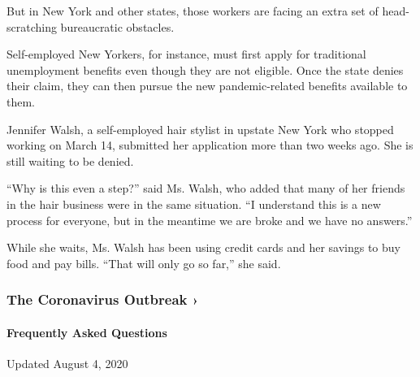 But in New York and other states, those workers are facing an extra set
of head-scratching bureaucratic obstacles.

Self-employed New Yorkers, for instance, must first apply for
traditional unemployment benefits even though they are not eligible.
Once the state denies their claim, they can then pursue the new
pandemic-related benefits available to them.

Jennifer Walsh, a self-employed hair stylist in upstate New York who
stopped working on March 14, submitted her application more than two
weeks ago. She is still waiting to be denied.

``Why is this even a step?'' said Ms. Walsh, who added that many of her
friends in the hair business were in the same situation. ``I understand
this is a new process for everyone, but in the meantime we are broke and
we have no answers.''

While she waits, Ms. Walsh has been using credit cards and her savings
to buy food and pay bills. ``That will only go so far,'' she said.

\href{https://www.nytimes3xbfgragh.onion/news-event/coronavirus?action=click\&pgtype=Article\&state=default\&region=MAIN_CONTENT_3\&context=storylines_faq}{}

\hypertarget{the-coronavirus-outbreak-}{%
\subsubsection{The Coronavirus Outbreak
›}\label{the-coronavirus-outbreak-}}

\hypertarget{frequently-asked-questions}{%
\paragraph{Frequently Asked
Questions}\label{frequently-asked-questions}}

Updated August 4, 2020

